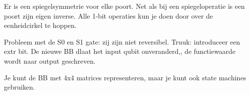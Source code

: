 \begin{center}
\end{center}

Er is een spiegelsymmetrie voor elke poort. Net als bij een spiegeloperatie is een poort zijn eigen inverse. 
Alle 1-bit operaties kun je doen door over de eenheidcirkel te hoppen.

Probleem met de S0 en S1 gate: zij zijn niet  reversibel. Truuk: introduceer een extr bit. De nieuwe BB dlaat het input qubit onveranderd,, de functiewaarde wordt naar output geschreven.

Je kunt de BB met 4x4 matrices representeren, maar je kunt ook state machines gebruiken.

